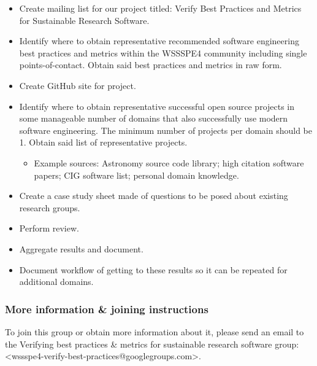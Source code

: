 \begin{itemize}
\item Create mailing list for our project titled:  Verify Best Practices and Metrics for Sustainable Research Software.
\item Identify where to obtain representative recommended software engineering best practices and metrics within the WSSSPE4 community including single points-of-contact.  Obtain said best practices and metrics in raw form.
\item Create GitHub site for project.
\item Identify where to obtain representative successful open source projects in some manageable number of domains that also successfully use modern software engineering.  The minimum number of projects per domain should be 1. Obtain said list of representative projects.

\begin{itemize}
\item Example sources: Astronomy source code library; high citation software papers; CIG software list; personal domain knowledge.
\end{itemize}

\item Create a case study sheet made of questions to be posed about existing research groups.
\item Perform review.
\item Aggregate results and document.  
\item Document workflow of getting to these results so it can be repeated for additional domains.
\end{itemize}


\subsubsection{More information \& joining instructions}

To join this group or obtain more information about it, please send an email to the Verifying best practices \& metrics for sustainable research software group: <wssspe4-verify-best-practices@googlegroups.com>.
